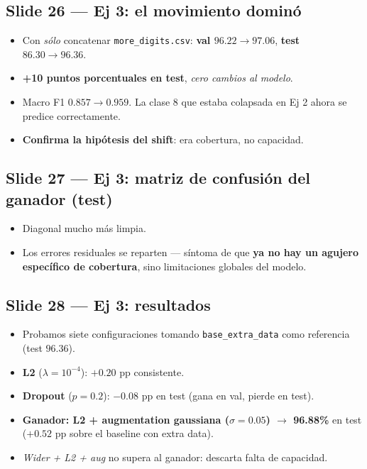 \documentclass[11pt,a4paper]{article}
\begin{document}
\subsection{Slide 26 — Ej 3: el movimiento dominó}

\begin{decir}
\begin{itemize}[leftmargin=*,topsep=0pt]
  \item Con \emph{sólo} concatenar \texttt{more\_digits.csv}:
        \textbf{val $96.22 \to 97.06$}, \textbf{test $86.30 \to 96.36$}.
  \item \textbf{+10 puntos porcentuales en test}, \emph{cero cambios al modelo}.
  \item Macro F1 $0.857 \to 0.959$. La clase 8 que estaba colapsada en Ej 2
        ahora se predice correctamente.
  \item \textbf{Confirma la hipótesis del shift}: era cobertura, no capacidad.
\end{itemize}
\end{decir}

\subsection{Slide 27 — Ej 3: matriz de confusión del ganador (test)}

\begin{decir}
\begin{itemize}[leftmargin=*,topsep=0pt]
  \item Diagonal mucho más limpia.
  \item Los errores residuales se reparten — síntoma de que \textbf{ya no hay un
        agujero específico de cobertura}, sino limitaciones globales del modelo.
\end{itemize}
\end{decir}

\subsection{Slide 28 — Ej 3: resultados}

\begin{decir}
\begin{itemize}[leftmargin=*,topsep=0pt]
  \item Probamos siete configuraciones tomando \texttt{base\_extra\_data} como
        referencia (test $96.36$).
  \item \textbf{L2} ($\lambda = 10^{-4}$): $+0.20$ pp consistente.
  \item \textbf{Dropout} ($p = 0.2$): $-0.08$ pp en test (gana en val, pierde en test).
  \item \textbf{Ganador: L2 + augmentation gaussiana ($\sigma = 0.05$) $\to$ 96.88\%}
        en test ($+0.52$ pp sobre el baseline con extra data).
  \item \emph{Wider + L2 + aug} no supera al ganador: descarta falta de capacidad.
\end{itemize}
\end{decir}
\end{document}
